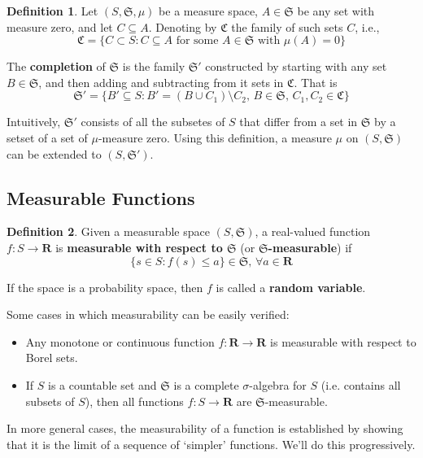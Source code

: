 \documentclass[12pt,a4paper]{article}
\theoremstyle{definition}
\newtheorem{definition}{Definition}[section]
\begin{document}
\begin{definition}
	Let $(S, \mathfrak{S}, \mu)$ be a measure space, $A \in \mathfrak{S}$ be any set with measure zero, and let $C \subseteq A$. Denoting by $\mathfrak{C}$ the family of such sets $C$, i.e.,
	\[
		\mathfrak{C} = \{ C \subset S : C \subseteq A \text{ for some } A \in \mathfrak{S} \text{ with } \mu(A) = 0 \}
	\]

	The \textbf{completion} of $\mathfrak{S}$ is the family $\mathfrak{S}'$ constructed by starting with any set $B \in \mathfrak{S}$, and then adding and subtracting from it sets in $\mathfrak{C}$. That is 
	\[
		\mathfrak{S}' = \{ B' \subseteq S : B' = (B \cup C_1) \setminus C_2, \, B \in \mathfrak{S}, \, C_1, C_2 \in \mathfrak{C} \} 
	\]
\end{definition}

Intuitively, $\mathfrak{S}'$ consists of all the subsetes of $S$ that differ from a set in $\mathfrak{S}$ by a setset of a set of $\mu$-measure zero. Using this definition, a measure $\mu$ on $(S, \mathfrak{S})$ can be extended to $(S, \mathfrak{S}')$.

\subsection{Measurable Functions}

\begin{definition}
	Given a measurable space $(S, \mathfrak{S})$, a real-valued function $f : S \longrightarrow \textbf{R}$ is \textbf{measurable with respect to $\mathfrak{S}$} (or \textbf{$\mathfrak{S}$-measurable}) if 
	\[
		\{ s \in S : f(s) \leq a \} \in \mathfrak{S}, \, \forall a \in \textbf{R}
	\]
\end{definition}

If the space is a probability space, then $f$ is called a \textbf{random variable}.

Some cases in which measurability can be easily verified:
\begin{itemize}
	\item Any monotone or continuous function $f : \textbf{R} \longrightarrow \textbf{R}$ is measurable with respect to Borel sets.
	\item If $S$ is a countable set and $\mathfrak{S}$ is a complete $\sigma$-algebra for $S$ (i.e. contains all subsets of $S$), then all functions $f : S \longrightarrow \textbf{R}$ are $\mathfrak{S}$-measurable.
\end{itemize}

In more general cases, the measurability of a function is established by showing that it is the limit of a sequence of `simpler' functions. We'll do this progressively.
\end{document}
